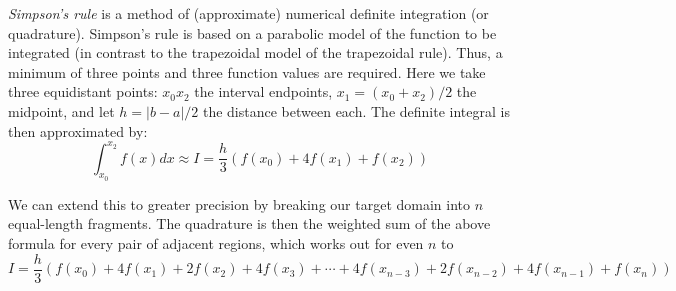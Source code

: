 \documentclass[12pt]{article}
\begin{document}
\emph{Simpson's rule} is a method of (approximate) numerical definite integration (or quadrature).  Simpson's rule is based on a parabolic model of the function to be integrated (in contrast to the trapezoidal model of the trapezoidal rule).  Thus, a minimum of three points and three function values are required. Here we take three equidistant points: $x_0x_2$ the interval endpoints, $x_1=(x_0+x_2)/2$ the midpoint, and let $h=|b-a|/2$ the distance between each. The definite integral is then approximated by:
\[
\int_{x_0}^{x_2} f(x) dx \approx I = \frac{h}{3} (f(x_0) + 4f(x_1) + f(x_2))
\]

We can extend this to greater precision by breaking our target domain into $n$ equal-length fragments.  The quadrature is then the weighted sum of the above formula for every pair of adjacent regions, which works out for even $n$ to
\[
 I = \frac{h}{3} (f(x_0) + 4f(x_1) + 2f(x_2) + 4f(x_3) + \cdots + 4f(x_{n-3}) + 2f(x_{n-2}) + 4f(x_{n-1}) + f(x_n)) 
\]
\end{document}
